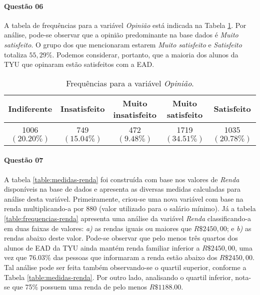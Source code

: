 \documentclass[10pt,a4paper,oneside]{article}
\begin{document}
\paragraph{Questão 06}

A tabela de frequências para a variável \textit{Opinião} está indicada na Tabela \ref{table:frequencias-opiniao}. Por análise, pode-se observar que a opinião predominante na base dados é \textit{Muito satisfeito}. O grupo dos que mencionaram estarem \textit{Muito satisfeito} e \textit{Satisfeito} totaliza $55,29\%$. Podemos considerar, portanto, que a maioria dos alunos da TYU que opinaram estão satisfeitos com a EAD.

\begin{table}[!h]
\centering
\caption{Frequências para a variável \textit{Opinião}.}
\vspace{0.5em}
\label{table:frequencias-opiniao}
\begin{tabular}{c c c c c}
	\toprule
	\textbf{Indiferente}    & \textbf{Insatisfeito}   & \textbf{Muito insatisfeito}  & \textbf{Muito satisfeito} & \textbf{Satisfeito} \\
	\midrule
	1006 $(20.20\%)$ & 749 $(15.04\%)$ & 472 $(9.48\%)$ & 1719 $(34.51\%)$ & 1035 $(20.78\%)$ \\
	\bottomrule
\end{tabular}
\end{table}


\paragraph{Questão 07}

A tabela \ref{table:medidas-renda} foi construída com base nos valores de \textit{Renda} disponíveis na base de dados e apresenta as diversas medidas calculadas para análise desta variável. Primeiramente, criou-se uma nova variável com base na renda multiplicando-a por 880 (valor utilizado para o salário mínimo).  Já a tabela \ref{table:frequencias-renda} apresenta uma análise da variável \textit{Renda} classificando-a em duas faixas de valores: \textit{a)} as rendas iguais ou maiores que $R\$2450,00$; e \textit{b)} as rendas abaixo deste valor. Pode-se observar que pelo menos três quartos dos alunos de EAD da TYU ainda mantém renda familiar inferior a $R\$2450,00$, uma vez que $76.03\%$ das pessoas que informaram a renda estão abaixo dos $R\$2450,00$. Tal análise pode ser feita também observando-se o quartil superior, conforme a Tabela \ref{table:medidas-renda}. Por outro lado, analisando o quartil inferior, nota-se que 75\% possuem uma renda de pelo menos $R\$1188.00$. 
\end{document}
